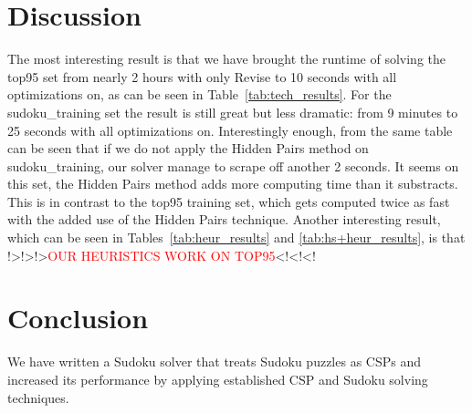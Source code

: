 \documentclass[11pt]{article} %
\begin{document}
\section{Discussion}
\label{sec:disc}
The most interesting result is that we have brought the runtime of solving the top95 set from nearly 2 hours with only Revise to 10 seconds with all optimizations on, as can be seen in Table~\ref{tab:tech_results}. For the sudoku\_training set the result is still great but less dramatic: from 9 minutes to 25 seconds with all optimizations on. Interestingly enough, from the same table can be seen that if we do not apply the Hidden Pairs method on sudoku\_training, our solver manage to scrape off another 2 seconds. It seems on this set, the Hidden Pairs method adds more computing time than it substracts. This is in contrast to the top95 training set, which gets computed twice as fast with the added use of the Hidden Pairs technique.
Another interesting result, which can be seen in Tables~\ref{tab:heur_results} and \ref{tab:hs+heur_results}, is that !>!>!>\textcolor{red}{OUR HEURISTICS WORK ON TOP95}<!<!<!

\section{Conclusion}
\label{sec:concl}
We have written a Sudoku solver that treats Sudoku puzzles as CSPs and increased its performance by applying established CSP and Sudoku solving techniques.



\end{document}
